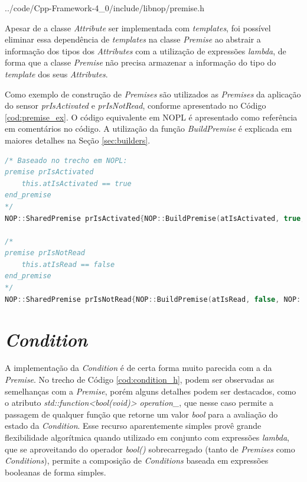 
            {../code/Cpp-Framework-4_0/include/libnop/premise.h}

Apesar de a classe \textit{Attribute} ser implementada com \textit{templates},
foi possível eliminar essa dependência de \textit{templates} na classe
\textit{Premise} ao abstrair a informação dos tipos dos \textit{Attributes} com
a utilização de expressões \textit{lambda}, de forma que a classe
\textit{Premise} não precisa armazenar a informação do tipo do \textit{template}
dos seus \textit{Attributes}.

\FloatBarrier

Como exemplo de construção de \textit{Premises} são utilizados as
\textit{Premises} da aplicação do sensor \textit{prIsActivated} e
\textit{prIsNotRead}, conforme apresentado no Código \ref{cod:premise_ex}. O
código equivalente em NOPL é apresentado como referência em comentários no
código. A utilização da função \textit{BuildPremise} é explicada em maiores
detalhes na Seção \ref{sec:builders}.

\begin{lstlisting}[language=C++, float=htb,
    caption = {Criação de \textit{Premises} no \textit{Framework} PON C++ 4.0},
    source = {Autoria própria},
    label ={cod:premise_ex}]
/* Baseado no trecho em NOPL:
premise prIsActivated
    this.atIsActivated == true
end_premise
*/
NOP::SharedPremise prIsActivated{NOP::BuildPremise(atIsActivated, true, NOP::Equal())};

/*
premise prIsNotRead
    this.atIsRead == false
end_premise
*/
NOP::SharedPremise prIsNotRead{NOP::BuildPremise(atIsRead, false, NOP::Equal())};
\end{lstlisting}

\section{\textit{Condition}}\label{sec:condition}

A implementação da \textit{Condition} é de certa forma muito parecida com a da
\textit{Premise}. No trecho de Código \ref{cod:condition_h}, podem ser
observadas as semelhanças com a \textit{Premise}, porém alguns detalhes podem
ser destacados, como o atributo \textit{std::function<bool(void)> operation\_},
que nesse caso permite a passagem de qualquer função que retorne um valor
\textit{bool} para a avaliação do estado da \textit{Condition}. Esse recurso
aparentemente simples provê grande flexibilidade algorítmica quando utilizado em
conjunto com expressões \textit{lambda}, que se aproveitando do operador
\textit{bool()} sobrecarregado (tanto de \textit{Premises} como
\textit{Conditions}), permite a composição de \textit{Conditions} baseada em
expressões booleanas de forma simples.

